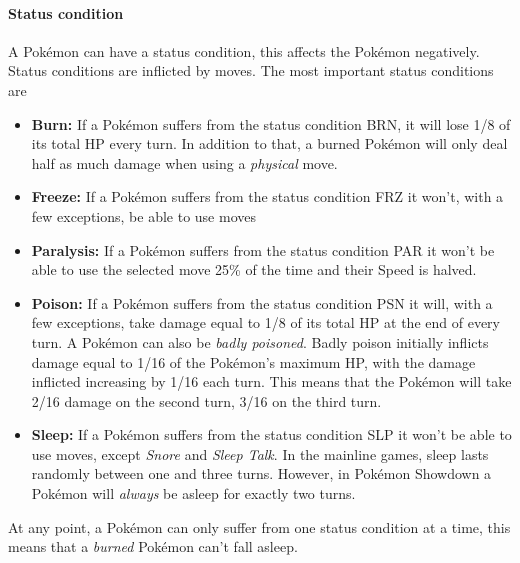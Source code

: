 \paragraph{Status condition}
A Pokémon can have a status condition, this affects the Pokémon negatively. Status conditions are
inflicted by moves. The most important status conditions are
\begin{itemize}
	\item \textbf{Burn:} If a Pokémon suffers from the status condition \ac{BRN}, it will lose 1/8 of its
		total \ac{HP} every turn. In addition to that, a burned Pokémon will only deal half as much damage
		when using a \textit{physical} move.
	\item \textbf{Freeze:} If a Pokémon suffers from the status condition \ac{FRZ} it won't, with a few exceptions,
		be able to use moves
	\item \textbf{Paralysis:} If a Pokémon suffers from the status condition \ac{PAR} it won't be able to use 
		the selected move 25\% of the time and their Speed is halved.
	\item \textbf{Poison:} If a Pokémon suffers from the status condition \ac{PSN} it will, with a few exceptions,
		take damage equal to 1/8 of its total \ac{HP} at the end of every turn. A Pokémon can also be 
		\textit{badly poisoned}. Badly poison initially inflicts damage equal to 1/16 of the Pokémon's maximum
		\ac{HP}, with the damage inflicted increasing by 1/16 each turn. This means that the Pokémon will
		take 2/16 damage on the second turn, 3/16 on the third turn.
	\item \textbf{Sleep:} If a Pokémon suffers from the status condition \ac{SLP} it won't be able to use moves,
		except \textit{Snore} and \textit{Sleep Talk}. In the mainline games, sleep lasts randomly between
		one and three turns. However, in Pokémon Showdown a Pokémon will \textit{always} be asleep for exactly
		two turns.
\end{itemize}

At any point, a Pokémon can only suffer from one status condition at a time, this means that a 
\textit{burned} Pokémon can't fall asleep.


